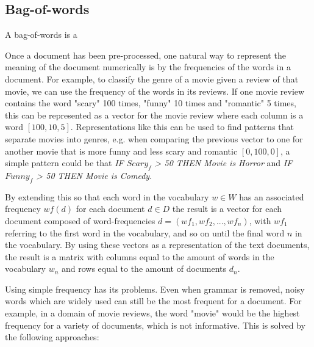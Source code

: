 
\subsection{Bag-of-words}\label{bg:BOW}

A bag-of-words is a

Once a document has been pre-processed, one natural way to represent the meaning of the document numerically is by  the frequencies of the words in a document. For example, to classify the genre of a movie given a review of that movie, we can use the frequency of the words in its reviews. If one movie review contains the word "scary" 100 times, "funny" 10 times and "romantic" 5 times, this can be represented as a vector for the movie review where each column is a word $[100, 10, 5]$. Representations like this can be used to find patterns that separate movies into genres, e.g. when comparing the previous vector to one for another movie that is more funny and less scary and romantic $[0, 100, 0]$, a simple pattern could be that \textit{IF $Scary_f$ > 50 THEN Movie is Horror} and \textit{IF $Funny_f$ > 50 THEN Movie is Comedy}.

By extending this  so that each word in the vocabulary $w \in W$ has an associated frequency ${wf}(d)$ for each document  $d \in D$  the result is a vector for each document composed of word-frequencies  $d = ({wf}_1, {wf}_2, ..., {wf}_n)$, with ${wf}_1$ referring to the first word in the vocabulary, and so on until the final word $n$ in the vocabulary. By using these vectors as a representation of the text documents, the result is a matrix  with columns equal to the amount of words in the vocabulary $w_n$ and rows equal to the amount of documents $d_n$. 

Using simple frequency has its problems. Even when grammar is removed, noisy words which are widely used can still be the most frequent for a document. For example, in a domain of movie reviews, the word "movie" would be the highest frequency for a variety of documents, which is not informative. This is solved by the following approaches:

